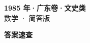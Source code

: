 \documentclass[zihao=-4, a4paper]{ctexart}
\begin{document}
\begin{center}
  {\Large\bfseries 1985 年·广东卷·文史类}\\[4pt]
  {\large 数学 · 简答版}
\end{center}
\medskip
{}

\clearpage
{}
\begin{center}{\Large\bfseries 答案速查}\end{center}
\medskip

\end{document}
